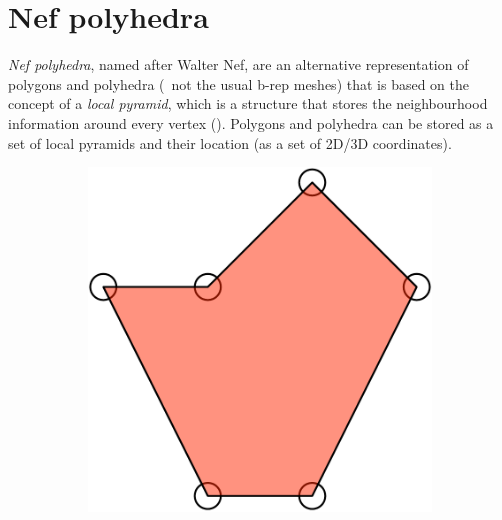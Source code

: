 \section{Nef polyhedra}

\emph{Nef polyhedra}, named after Walter Nef, are an alternative representation of polygons and polyhedra (\ie\ not the usual b-rep meshes) that is based on the concept of a \emph{local pyramid}, which is a structure that stores the neighbourhood information around every vertex ().
Polygons and polyhedra can be stored as a set of local pyramids and their location (as a set of 2D/3D coordinates).

\begin{figure}
\centering
\begin{subfigure}[b]{0.5\linewidth}
\includegraphics[width=\linewidth]{figs/nef-1}
\caption{}%
\end{subfigure}
\begin{subfigure}[b]{0.35\linewidth}

\end{subfigure}
\end{figure}
